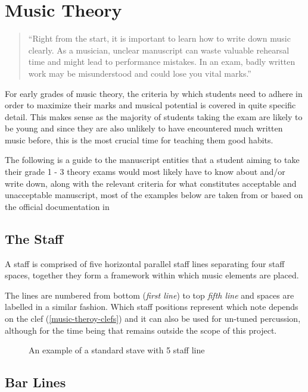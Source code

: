 \section{Music Theory}

\blockquote{``Right from the start, it is important to learn how to write down music clearly. As a musician, unclear manuscript can waste valuable rehearsal time and might lead to performance mistakes. In an exam, badly written work may be misunderstood and could lose you vital marks.'' \parencite{taylor1989ab}}

For early grades of music theory, the criteria by which students need to adhere in order to maximize their marks and musical potential is covered in quite specific detail. This makes sense as the majority of students taking the exam are likely to be young and since they are also unlikely to have encountered much written music before, this is the most crucial time for teaching them good habits.

The following is a guide to the manuscript entities that a student aiming to take their grade 1 - 3 theory exams would most likely have to know about and/or write down, along with the relevant criteria for what constitutes acceptable and unacceptable manuscript, most of the examples below are taken from or based on the official documentation in \parencite{taylor2008music}

\subsection{The Staff}

A staff is comprised of five horizontal parallel staff lines separating four staff spaces, together they form a framework within which music elements are placed.

The lines are numbered from bottom (\emph{first line}) to top \emph{fifth line} and spaces are labelled in a similar fashion. Which staff positions represent which note depends on the clef (\cref{music-theroy-clefs}) and it can also be used for un-tuned percussion, although for the time being that remains outside the scope of this project.

\begin{figure}[H]
  \centering
  \caption{An example of a standard stave with 5 staff line}
\end{figure}

\subsection{Bar Lines}

